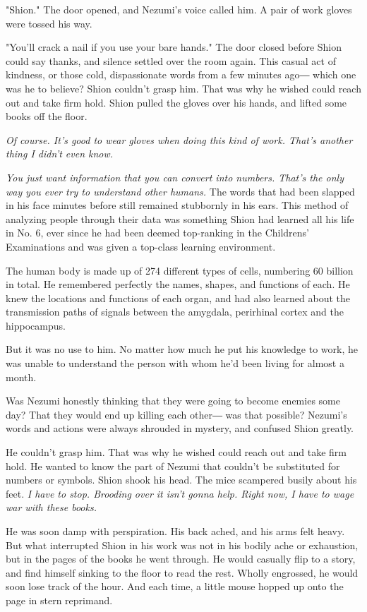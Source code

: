"Shion." The door opened, and Nezumi's voice called him. A pair of work
gloves were tossed his way.

"You'll crack a nail if you use your bare hands." The door closed before
Shion could say thanks, and silence settled over the room again. This
casual act of kindness, or those cold, dispassionate words from a few
minutes ago― which one was he to believe? Shion couldn't grasp him. That
was why he wished could reach out and take firm hold. Shion pulled the
gloves over his hands, and lifted some books off the floor.

\emph{Of course. It's good to wear gloves when doing this kind of work. That's
	another thing I didn't even know.}

\emph{You just want information that you can convert into numbers. That's the
	only way you ever try to understand other humans.} The words that had
been slapped in his face minutes before still remained stubbornly in his
ears. This method of analyzing people through their data was something
Shion had learned all his life in No. 6, ever since he had been deemed
top-ranking in the Childrens' Examinations and was given a top-class
learning environment.

The human body is made up of 274 different types of cells, numbering 60
billion in total. He remembered perfectly the names, shapes, and
functions of each. He knew the locations and functions of each organ,
and had also learned about the transmission paths of signals between the
amygdala, perirhinal cortex and the hippocampus.

But it was no use to him. No matter how much he put his knowledge to
work, he was unable to understand the person with whom he'd been living
for almost a month.

Was Nezumi honestly thinking that they were going to become enemies some
day? That they would end up killing each other― was that possible?
Nezumi's words and actions were always shrouded in mystery, and confused
Shion greatly.

He couldn't grasp him. That was why he wished could reach out and take
firm hold. He wanted to know the part of Nezumi that couldn't be
substituted for numbers or symbols. Shion shook his head. The mice
scampered busily about his feet. \emph{I have to stop. Brooding over it isn't
	gonna help. Right now, I have to wage war with these books.}

He was soon damp with perspiration. His back ached, and his arms felt
heavy. But what interrupted Shion in his work was not in his bodily ache
or exhaustion, but in the pages of the books he went through. He would
casually flip to a story, and find himself sinking to the floor to read
the rest. Wholly engrossed, he would soon lose track of the hour. And
each time, a little mouse hopped up onto the page in stern reprimand.


